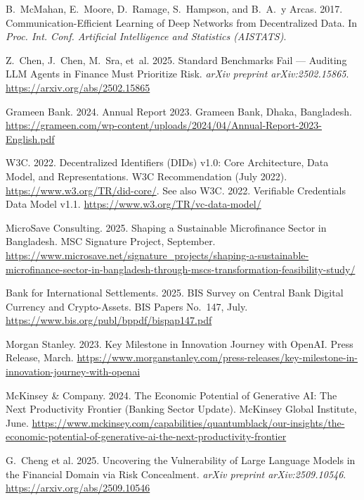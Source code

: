 \documentclass[12pt,a4paper]{report}
\begin{document}
{\begin{enumerate}[label={[\arabic*]}]
\item B.~McMahan, E.~Moore, D.~Ramage, S.~Hampson, and B.~A.~y Arcas. 2017. Communication-Efficient Learning of Deep Networks from Decentralized Data. In \emph{Proc. Int. Conf. Artificial Intelligence and Statistics (AISTATS)}.

\item Z.~Chen, J.~Chen, M.~Sra, et~al. 2025. Standard Benchmarks Fail --- Auditing LLM Agents in Finance Must Prioritize Risk. \emph{arXiv preprint arXiv:2502.15865}. \url{https://arxiv.org/abs/2502.15865}

\item Grameen Bank. 2024. Annual Report 2023. Grameen Bank, Dhaka, Bangladesh. \url{https://grameen.com/wp-content/uploads/2024/04/Annual-Report-2023-English.pdf}

\item W3C. 2022. Decentralized Identifiers (DIDs) v1.0: Core Architecture, Data Model, and Representations. W3C Recommendation (July 2022). \url{https://www.w3.org/TR/did-core/}. See also W3C. 2022. Verifiable Credentials Data Model v1.1. \url{https://www.w3.org/TR/vc-data-model/}

\item MicroSave Consulting. 2025. Shaping a Sustainable Microfinance Sector in Bangladesh. MSC Signature Project, September. \url{https://www.microsave.net/signature_projects/shaping-a-sustainable-microfinance-sector-in-bangladesh-through-mscs-transformation-feasibility-study/}

\item Bank for International Settlements. 2025. BIS Survey on Central Bank Digital Currency and Crypto-Assets. BIS Papers No.~147, July. \url{https://www.bis.org/publ/bppdf/bispap147.pdf}

\item Morgan Stanley. 2023. Key Milestone in Innovation Journey with OpenAI. Press Release, March. \url{https://www.morganstanley.com/press-releases/key-milestone-in-innovation-journey-with-openai}

\item McKinsey \& Company. 2024. The Economic Potential of Generative AI: The Next Productivity Frontier (Banking Sector Update). McKinsey Global Institute, June. \url{https://www.mckinsey.com/capabilities/quantumblack/our-insights/the-economic-potential-of-generative-ai-the-next-productivity-frontier}

\item G.~Cheng et al. 2025. Uncovering the Vulnerability of Large Language Models in the Financial Domain via Risk Concealment. \emph{arXiv preprint arXiv:2509.10546}. \url{https://arxiv.org/abs/2509.10546}


\end{enumerate}}
\end{document}
